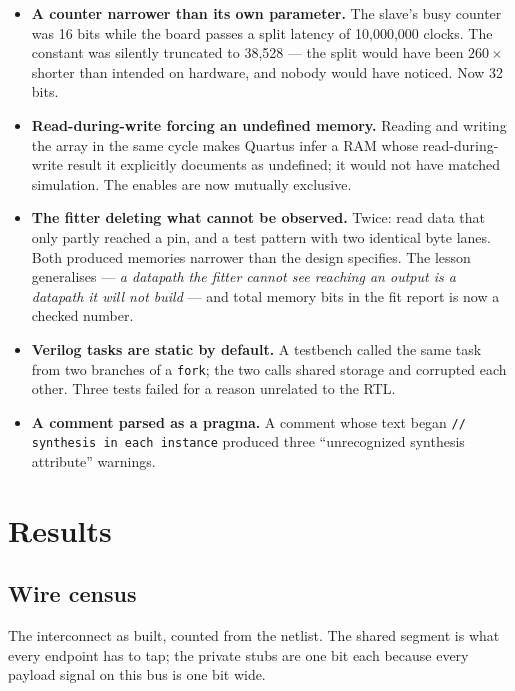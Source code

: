 \documentclass[11pt,a4paper]{article}
\newcommand{\sig}[1]{\texttt{#1}}
\begin{document}
\begin{itemize}[leftmargin=1.4em,itemsep=3pt]
\item \textbf{A counter narrower than its own parameter.} The slave's busy
counter was 16 bits while the board passes a split latency of 10{,}000{,}000
clocks. The constant was silently truncated to 38{,}528 --- the split would
have been $260\times$ shorter than intended on hardware, and nobody would
have noticed. Now 32 bits.

\item \textbf{Read-during-write forcing an undefined memory.} Reading and
writing the array in the same cycle makes Quartus infer a RAM whose
read-during-write result it explicitly documents as undefined; it would not
have matched simulation. The enables are now mutually exclusive.

\item \textbf{The fitter deleting what cannot be observed.} Twice: read data
that only partly reached a pin, and a test pattern with two identical byte
lanes. Both produced memories narrower than the design specifies. The lesson
generalises --- \emph{a datapath the fitter cannot see reaching an output is
a datapath it will not build} --- and total memory bits in the fit report is
now a checked number.

\item \textbf{Verilog tasks are static by default.} A testbench called the
same task from two branches of a \sig{fork}; the two calls shared storage and
corrupted each other. Three tests failed for a reason unrelated to the RTL.

\item \textbf{A comment parsed as a pragma.} A comment whose text began
\sig{// synthesis in each instance} produced three
``unrecognized synthesis attribute'' warnings.
\end{itemize}

\section{Results}

\subsection{Wire census}

The interconnect as built, counted from the netlist. The shared segment is
what every endpoint has to tap; the private stubs are one bit each because
every payload signal on this bus is one bit wide.
\end{document}
